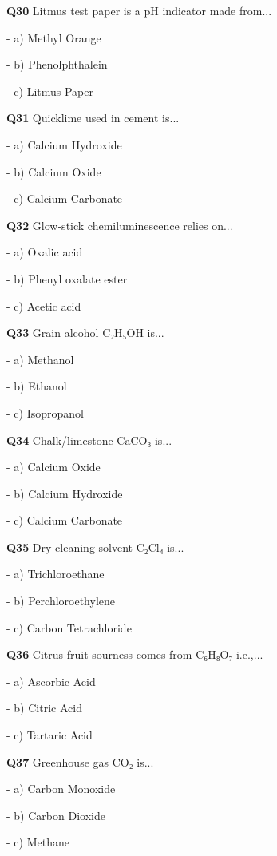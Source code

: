 \textbf{Q30} Litmus test paper is a pH indicator made from...\par
\quad - a) Methyl Orange\par
\quad - b) Phenolphthalein\par
\quad - c) Litmus Paper\par

\textbf{Q31} Quicklime used in cement is...\par
\quad - a) Calcium Hydroxide\par
\quad - b) Calcium Oxide\par
\quad - c) Calcium Carbonate\par

\textbf{Q32} Glow‑stick chemiluminescence relies on...\par
\quad - a) Oxalic acid\par
\quad - b) Phenyl oxalate ester\par
\quad - c) Acetic acid\par

\textbf{Q33} Grain alcohol C₂H₅OH is...\par
\quad - a) Methanol\par
\quad - b) Ethanol\par
\quad - c) Isopropanol\par

\textbf{Q34} Chalk/limestone CaCO₃ is...\par
\quad - a) Calcium Oxide\par
\quad - b) Calcium Hydroxide\par
\quad - c) Calcium Carbonate\par

\textbf{Q35} Dry‑cleaning solvent C₂Cl₄ is...\par
\quad - a) Trichloroethane\par
\quad - b) Perchloroethylene\par
\quad - c) Carbon Tetrachloride\par

\textbf{Q36} Citrus‑fruit sourness comes from C₆H₈O₇ i.e.,...\par
\quad - a) Ascorbic Acid\par
\quad - b) Citric Acid\par
\quad - c) Tartaric Acid\par

\textbf{Q37} Greenhouse gas CO₂ is...\par
\quad - a) Carbon Monoxide\par
\quad - b) Carbon Dioxide\par
\quad - c) Methane\par


